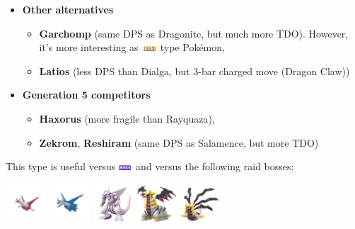 \documentclass[12pt]{beamer}
\newcommand{\dragonfull}{\includegraphics[height=0.2cm]{../../images/type/full/Dragon.png}}
\newcommand{\groundfull}{\includegraphics[height=0.2cm]{../../images/type/full/Ground.png}}
\begin{document}
\begin{frame}
\begin{footnotesize}
\begin{block}{}
\begin{center}
\begin{itemize}
\item \textbf{Other alternatives}
\begin{itemize}
  \item \footnotesize \textbf{Garchomp} (same DPS as Dragonite, but much more TDO). However, it's more interesting as~\groundfull~type Pok\'emon,
  \item \footnotesize \textbf{Latios} (less DPS than Dialga, but 3-bar charged move (Dragon Claw))
\end{itemize}
\item \textbf{Generation 5 competitors}
\begin{itemize}
  \item \footnotesize  \textbf{Haxorus} (more fragile than Rayquaza),
  \item \footnotesize \textbf{Zekrom}, \textbf{Reshiram} (same DPS as Salamence, but more TDO)
\end{itemize}
\end{itemize}
\end{center}
\end{block}

\begin{block}{}\begin{center}
This type is useful versus \dragonfull~and versus the following raid bosses:

    \includegraphics[width=1.5cm]{../../images/pokemon/latias.png}
    \includegraphics[width=1.5cm]{../../images/pokemon/latios.png}
    \includegraphics[width=1.5cm]{../../images/pokemon/palkia.png}\quad
    \includegraphics[width=1.5cm]{../../images/pokemon/giratina_a.png}\quad
    \includegraphics[width=1.5cm]{../../images/pokemon/giratina_o.png}
\end{center}
\end{block}

\end{footnotesize}
\end{frame}
\end{document}
